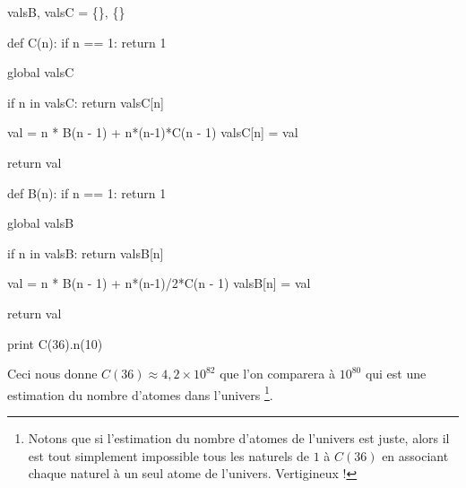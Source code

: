 \bigskip

\begin{myverb}
valsB, valsC = \{\}, \{\}

def C(n):
    if n == 1:
        return 1
        
    global valsC
    
    if n in valsC:
        return valsC[n]

    val      = n * B(n - 1) + n*(n-1)*C(n - 1)  
    valsC[n] = val
    
    return val

def B(n):
    if n == 1:
        return 1

    global valsB
    
    if n in valsB:
        return valsB[n]

    val      = n * B(n - 1) + n*(n-1)/2*C(n - 1)
    valsB[n] = val
    
    return val
    
print C(36).n(10)

\end{myverb}

\bigskip

Ceci nous donne $C(36) \approx 4,\!2 \times 10^{82}$ que l'on comparera à $10^{80}$ qui est une estimation du nombre d'atomes dans l'univers
\footnote{
    Notons que si l'estimation du nombre d'atomes de l'univers est juste, alors il est tout simplement impossible  tous les naturels de $1$ à $C(36)$ en associant chaque naturel à un seul atome de l'univers. Vertigineux !
}.
